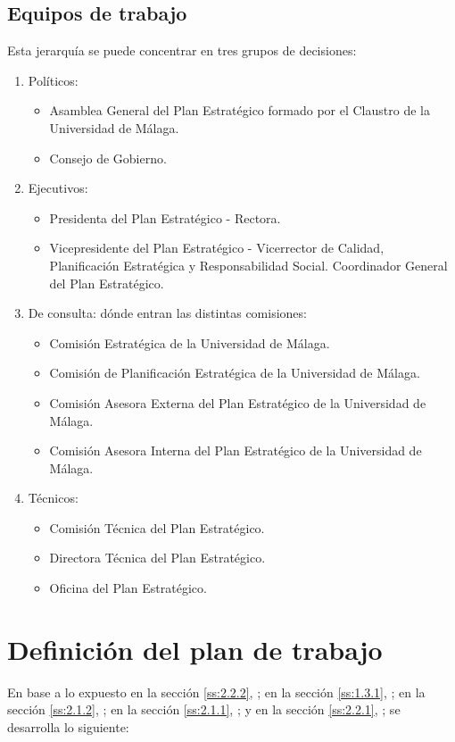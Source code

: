 \documentclass[11pt,a4paper,spanish,twoside]{book}
\begin{document}
\subsection{Equipos de trabajo} \label{ss:2.2.2}
Esta jerarquía se puede concentrar en tres grupos de decisiones:
\renewcommand{\labelenumi}{\alph{enumi}$)$ }
\begin{enumerate}
\item Políticos:
  \begin{itemize}
  \item Asamblea General del Plan Estratégico formado por el Claustro de la 
    Universidad de Málaga.
  \item Consejo de Gobierno.
  \end{itemize}
\item Ejecutivos:
  \begin{itemize}
  \item Presidenta del Plan Estratégico - Rectora.
  \item Vicepresidente del Plan Estratégico - Vicerrector de Calidad, 
    Planificación Estratégica y Responsabilidad Social. Coordinador General del 
    Plan Estratégico.
  \end{itemize}
\item De consulta: dónde entran las distintas comisiones:
  \begin{itemize}
  \item Comisión Estratégica de la Universidad de Málaga.
  \item Comisión de Planificación Estratégica de la Universidad de Málaga.
  \item Comisión Asesora Externa del Plan Estratégico de la Universidad de 
    Málaga.
  \item Comisión Asesora Interna del Plan Estratégico de la Universidad de 
    Málaga.
  \end{itemize}
\item Técnicos:
  \begin{itemize}
  \item Comisión Técnica del Plan Estratégico.
  \item Directora Técnica del Plan Estratégico.
  \item Oficina del Plan Estratégico.
  \end{itemize}
\end{enumerate}

\section{Definición del plan de trabajo}
En base a lo expuesto en la sección \vref{ss:2.2.2},
\emph{}; en la sección \vref{ss:1.3.1},
\emph{}; en la sección \vref{ss:2.1.2},
\emph{}; en la sección \vref{ss:2.1.1},
\emph{}; y en la sección \vref{ss:2.2.1},
\emph{}; se desarrolla lo siguiente:
\end{document}
